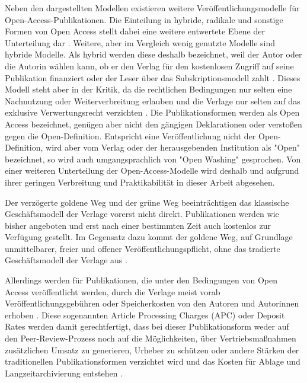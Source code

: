 Neben den dargestellten Modellen existieren weitere Veröffentlichungsmodelle für Open-Access-Publikationen. Die Einteilung in hybride, radikale und sonstige Formen von Open Access stellt dabei eine weitere entwertete Ebene der Unterteilung dar \cite{Mounce_2015}. Weitere, aber im Vergleich wenig genutzte Modelle sind hybride Modelle. Als hybrid werden diese deshalb bezeichnet, weil der Autor oder die Autorin wählen kann, ob er den Verlag für den kostenlosen Zugriff auf seine Publikation finanziert oder der Leser über das Subskriptionsmodell zahlt \cite{muller_2010_open}. Dieses Modell steht aber in der Kritik, da die rechtlichen Bedingungen nur selten eine Nachnutzung oder Weiterverbreitung erlauben und die Verlage nur selten auf das exklusive Verwertungsrecht verzichten \cite{muller_2010_open}. Die Publikationsformen werden als Open Access bezeichnet, genügen aber nicht den gängigen Deklarationen \cite{boai_2012} oder verstoßen gegen die Open-Definition. Entspricht eine Veröffentlichung nicht der Open-Definition, wird aber vom Verlag oder der herausgebenden Institution als "Open" bezeichnet, so wird auch umgangsprachlich von "Open Washing" gesprochen. Von einer weiteren Unterteilung der Open-Access-Modelle wird deshalb und aufgrund ihrer geringen Verbreitung und Praktikabilität in dieser Arbeit abgesehen.

Der verzögerte goldene Weg und der grüne Weg beeinträchtigen das klassische Geschäftsmodell der Verlage vorerst nicht direkt. Publikationen werden wie bisher angeboten und erst nach einer bestimmten Zeit auch kostenlos zur Verfügung gestellt. Im Gegensatz dazu kommt der goldene Weg, auf Grundlage unmittelbarer, freier und offener Veröffentlichungspflicht, ohne das tradierte Geschäftsmodell der Verlage aus \cite{lewis_2012_inevitability}.

Allerdings werden für Publikationen, die unter den Bedingungen von Open Access veröffentlicht werden, durch die Verlage meist vorab Veröffentlichungsgebühren oder Speicherkosten von den Autoren und Autorinnen erhoben \cite{jubb2011costs}. Diese sogenannten Article Processing Charges (APC) oder Deposit Rates werden damit gerechtfertigt, dass bei dieser Publikationsform weder auf den Peer-Review-Prozess noch auf die Möglichkeiten, über Vertriebsmaßnahmen zusätzlichen Umsatz zu generieren, Urheber zu schützen oder andere Stärken der traditionellen Publikationsformen verzichtet wird \cite{albert_2006_open_implications} \cite{Open_Access_net_2009} und das Kosten für Ablage und Langzeitarchivierung entstehen \cite{jubb2011costs}.

